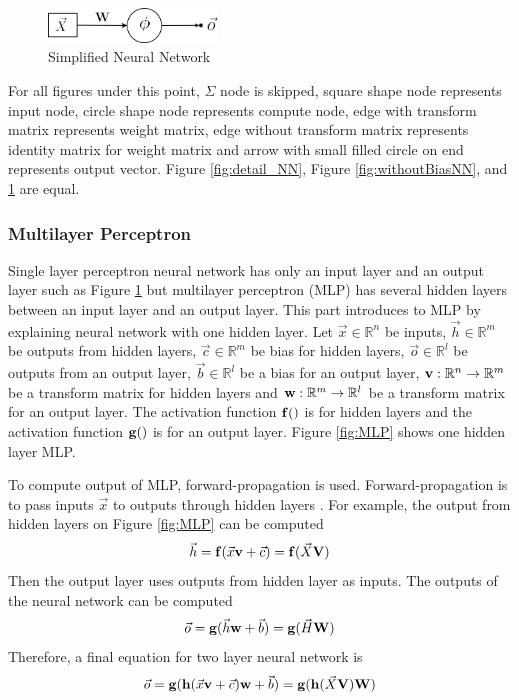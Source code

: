 \documentclass[draft,dvipsnames]{drexel-thesis}
\begin{document}
\begin{thesis}
\begin{figure}[t!]
    \centering
    \includegraphics[width=0.4\textwidth]{pictures/figures/NN.png}
    \caption{Simplified Neural Network}
    \label{fig:NN}
\end{figure}

	For all figures under this point, $\Sigma$ node is skipped, square shape node represents input node, circle shape node represents compute node, edge with transform matrix represents weight matrix, edge without transform matrix represents identity matrix for weight matrix and arrow with small filled circle on end represents output vector. Figure \ref{fig:detail_NN}, Figure \ref{fig:withoutBiasNN}, and \ref{fig:NN} are equal.


\subsubsection{Multilayer Perceptron}\label{subsubsec:MLP}
Single layer perceptron neural network has only an input layer and an output layer such as Figure \ref{fig:NN} but multilayer perceptron (MLP) has several hidden layers between an input layer and an output layer. This part introduces to MLP by explaining neural network with one hidden layer. Let $\vec{x} \in \mathbb{R}^n$ be inputs, $\vec{h} \in \mathbb{R}^m$ be outputs from hidden layers, $\vec{c} \in \mathbb{R}^m$ be bias for hidden layers, $\vec{o} \in \mathbb{R}^l$ be outputs from an output layer, $\vec{b} \in \mathbb{R}^l$ be a bias for an output layer, $\bold{v}: \mathbb{R}^n \rightarrow \mathbb{R}^m$ be a transform matrix for hidden layers and $\bold{w}: \mathbb{R}^m \rightarrow \mathbb{R}^l$ be a transform matrix for an output layer. The activation function $\bold{f}()$ is for hidden layers and the activation function $\bold{g}()$ is for an output layer. Figure \ref{fig:MLP} shows one hidden layer MLP.

To compute output of MLP, forward-propagation is used. Forward-propagation is to pass inputs $\vec{x}$ to outputs through hidden layers \cite{murphy2012machine}. For example, the output from hidden layers on Figure \ref{fig:MLP} can be computed
$$\vec{h} = \bold{f}(\vec{x}\bold{v}+\vec{c}) = \bold{f}(\vec{X}\bold{V})$$
Then the output layer uses outputs from hidden layer as inputs. The outputs of the neural network can be computed
$$\vec{o} = \bold{g}(\vec{h}\bold{w}+\vec{b}) = \bold{g}(\vec{H}\bold{W})$$
Therefore, a final equation for two layer neural network is
$$\vec{o} = \bold{g}(\bold{h}(\vec{x}\bold{v}+\vec{c})\bold{w}+\vec{b}) = \bold{g}(\bold{h}(\vec{X}\bold{V})\bold{W})$$


\end{thesis}
\end{document}
